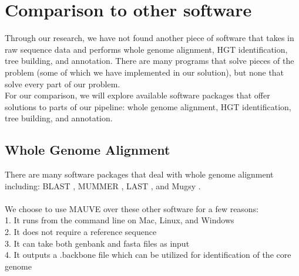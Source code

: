 \documentclass[12pt]{article}
\newcommand{\tab}{\hspace*{3em}}
\begin{document}
\section{Comparison to other software}
\tab Through our research, we have not found another piece of software that takes in raw sequence data and performs whole genome alignment, HGT identification, tree building, and annotation. There are many programs that solve pieces of the problem (some of which we have implemented in our solution), but none that solve every part of our problem. \\
\tab For our comparison, we will explore available software packages that offer solutions to parts of our pipeline: whole genome alignment, HGT identification, tree building, and annotation.\\
\subsection{Whole Genome Alignment}
There are many software packages that deal with whole genome alignment including: BLAST \cite{Blast}, MUMMER \cite{Mummer}, LAST \cite{Last}, and Mugsy \cite{Mugsy}.\\
\\
We choose to use MAUVE \cite{mauve} over these other software for a few reasons:\\
\tab 1. It runs from the command line on Mac, Linux, and Windows\\
\tab 2. It does not require a reference sequence\\
\tab 3. It can take both genbank and fasta files as input\\
\tab 4. It outputs a .backbone file which can be utilized for identification of the core genome\\
\end{document}
